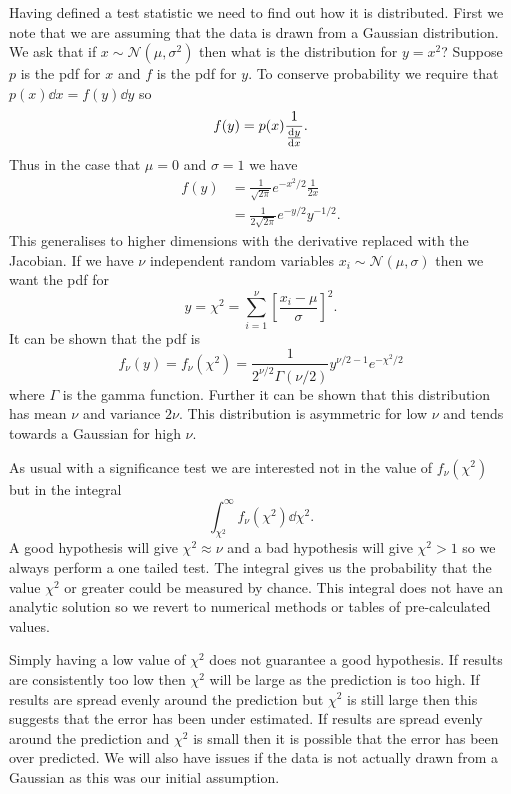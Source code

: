 \documentclass[a4paper]{article}
\newcommand{\distributed}{\sim}
\newcommand{\normal}{\mathcal{N}}
\begin{document}
    Having defined a test statistic we need to find out how it is distributed.
    First we note that we are assuming that the data is drawn from a Gaussian distribution.
    We ask that if \(x\distributed\normal(\mu, \sigma^2)\) then what is the distribution for \(y = x^2\)?
    Suppose \(p\) is the \gls{pdf} for \(x\) and \(f\) is the \gls{pdf} for \(y\).
    To conserve probability we require that \(p(x)\dd{x} = f(y)\dd{y}\) so
    \[f(y) = p(x)\frac{1}{\dv{y}{x}}.\]
    Thus in the case that \(\mu = 0\) and \(\sigma = 1\) we have
    \begin{align*}
        f(y) &= \frac{1}{\sqrt{2\pi}}e^{-x^2/2}\frac{1}{2x}\\
        &= \frac{1}{2\sqrt{2\pi}}e^{-y/2}y^{-1/2}.
    \end{align*}
    This generalises to higher dimensions with the derivative replaced with the Jacobian.
    If we have \(\nu\) independent random variables \(x_i\distributed\normal(\mu, \sigma)\) then we want the \gls{pdf} for
    \[y = \chi^2 = \sum_{i=1}^{\nu} \left[\frac{x_i - \mu}{\sigma}\right]^2.\]
    It can be shown that the \gls{pdf} is
    \[f_\nu(y) = f_\nu(\chi^2) = \frac{1}{2^{\nu/2}\Gamma(\nu/2)}y^{\nu/2-1}e^{-\chi^2/2}\]
    where \(\Gamma\) is the gamma function.
    Further it can be shown that this distribution has mean \(\nu\) and variance \(2\nu\).
    This distribution is asymmetric for low \(\nu\) and tends towards a Gaussian for high \(\nu\).
    
    As usual with a significance test we are interested not in the value of \(f_\nu(\chi^2)\) but in the integral
    \[\int_{\chi^2}^{\infty} f_{\nu}(\chi^2)\dd{\chi^2}.\]
    A good hypothesis will give \(\chi^2 \approx \nu\) and a bad hypothesis will give \(\chi^2 > 1\) so we always perform a one tailed test.
    The integral gives us the probability that the value \(\chi^2\) or greater could be measured by chance.
    This integral does not have an analytic solution so we revert to numerical methods or tables of pre-calculated values.
    
    Simply having a low value of \(\chi^2\) does not guarantee a good hypothesis.
    If results are consistently too low then \(\chi^2\) will be large as the prediction is too high.
    If results are spread evenly around the prediction but \(\chi^2\) is still large then this suggests that the error has been under estimated.
    If results are spread evenly around the prediction and \(\chi^2\) is small then it is possible that the error has been over predicted.
    We will also have issues if the data is not actually drawn from a Gaussian as this was our initial assumption.
    
\end{document}
